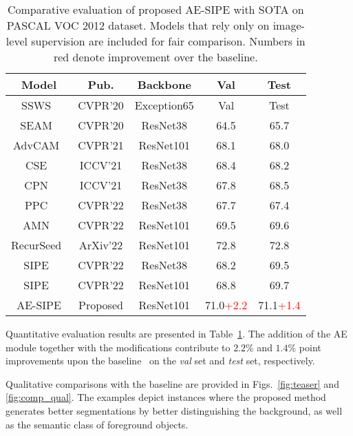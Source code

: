 \documentclass{article}
\begin{document}
\begin{table}
\centering
\caption{Comparative evaluation of proposed AE-SIPE with SOTA on PASCAL VOC 2012 dataset. Models that rely only on image-level supervision are included for fair comparison. Numbers in red denote improvement over the baseline.} 
\begin{tabular}{c  c  c  c  c }
\toprule%
Model & Pub. & Backbone & Val & Test \\
\midrule%
SSWS~\cite{PAMR} & {\scriptsize{CVPR'20}} & \scriptsize{Exception65} & Val & Test \\
SEAM~\cite{SEAM} & {\scriptsize{CVPR'20}} & \scriptsize{ResNet38} & 64.5 & 65.7 \\
AdvCAM~\cite{AdvCAM} & {\scriptsize{CVPR'21}} & \scriptsize{ResNet101} & 68.1 & 68.0 \\
CSE~\cite{CSE}  & {\scriptsize{ICCV'21}} & \scriptsize{ResNet38} & 68.4 & 68.2 \\
CPN~\cite{CPN} & {\scriptsize{ICCV'21}} & \scriptsize{ResNet38} & 67.8 & 68.5 \\
PPC~\cite{PPC} & {\scriptsize{CVPR'22}} & \scriptsize{ResNet38} & 67.7 & 67.4 \\ 
AMN~\cite{AMN} & {\scriptsize{CVPR'22}} & \scriptsize{ResNet101} & 69.5 & 69.6 \\ 
RecurSeed~\cite{RecurSeed} & {\scriptsize{ArXiv'22}} & \scriptsize{ResNet101} & 72.8 & 72.8 \\
SIPE~\cite{SIPE} & {\scriptsize{CVPR'22}} & \scriptsize{ResNet38} & 68.2 & 69.5 \\
SIPE~\cite{SIPE} & {\scriptsize{CVPR'22}} & \scriptsize{ResNet101} & 68.8 & 69.7 \\
AE-SIPE & {\scriptsize{Proposed}} & \scriptsize{ResNet101} & 71.0{\scriptsize{\textcolor{red}{+2.2}}} & 71.1{\scriptsize{\textcolor{red}{+1.4}}} \\
\bottomrule%
\end{tabular}
\label{tbl:quant}
\end{table}

Quantitative evaluation results are presented in Table~\ref{tbl:quant}. 
The addition of the AE module together with the modifications contribute to $2.2\%$ and $1.4\%$ point improvements upon the baseline~\cite{SIPE} on the \emph{val} set and \emph{test} set, respectively. 

Qualitative comparisons with the baseline are provided in Figs.~\ref{fig:teaser} and \ref{fig:comp_qual}. 
The examples depict instances where the proposed method generates better segmentations by better distinguishing the background, as well as the semantic class of foreground objects.
\end{document}
